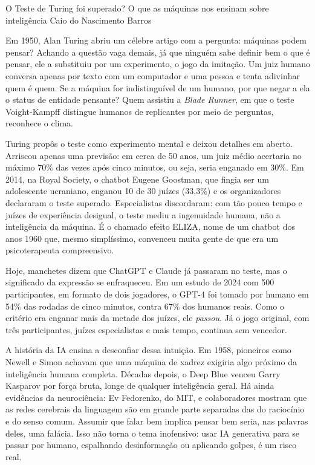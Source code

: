 \hypearticle
{O Teste de Turing foi superado? O que as máquinas nos ensinam sobre inteligência}
{Caio do Nascimento Barros}
{

\subtitle{Uma Pergunta Trocada por um Jogo}

\hspace*{1.5em}Em 1950, Alan Turing abriu um célebre artigo com a pergunta: máquinas podem pensar? Achando a questão vaga demais, já que ninguém sabe definir bem o que é pensar, ele a substituiu por um experimento, o jogo da imitação. Um juiz humano conversa apenas por texto com um computador e uma pessoa e tenta adivinhar quem é quem. Se a máquina for indistinguível de um humano, por que negar a ela o status de entidade pensante? Quem assistiu a \textit{Blade Runner}, em que o teste Voight-Kampff distingue humanos de replicantes por meio de perguntas, reconhece o clima.

\subtitle{Quando o Teste Vira Manchete}

\hspace*{1.5em}Turing propôs o teste como experimento mental e deixou detalhes em aberto. Arriscou apenas uma previsão: em cerca de 50 anos, um juiz médio acertaria no máximo 70\% das vezes após cinco minutos, ou seja, seria enganado em 30\%. Em 2014, na Royal Society, o chatbot Eugene Goostman, que fingia ser um adolescente ucraniano, enganou 10 de 30 juízes (33,3\%) e os organizadores declararam o teste superado. Especialistas discordaram: com tão pouco tempo e juízes de experiência desigual, o teste mediu a ingenuidade humana, não a inteligência da máquina. É o chamado efeito ELIZA, nome de um chatbot dos anos 1960 que, mesmo simplíssimo, convenceu muita gente de que era um psicoterapeuta compreensivo.

\hspace*{1.5em}Hoje, manchetes dizem que ChatGPT e Claude já passaram no teste, mas o significado da expressão se enfraqueceu. Em um estudo de 2024 com 500 participantes, em formato de dois jogadores, o GPT-4 foi tomado por humano em 54\% das rodadas de cinco minutos, contra 67\% dos humanos reais. Como o critério era enganar mais da metade dos juízes, ele \textit{passou}. Já o jogo original, com três participantes, juízes especialistas e mais tempo, continua sem vencedor.

\subtitle{Fluência Não É Inteligência}

\hspace*{1.5em}A história da IA ensina a desconfiar dessa intuição. Em 1958, pioneiros como Newell e Simon achavam que uma máquina de xadrez exigiria algo próximo da inteligência humana completa. Décadas depois, o Deep Blue venceu Garry Kasparov por força bruta, longe de qualquer inteligência geral. Há ainda evidências da neurociência: Ev Fedorenko, do MIT, e colaboradores mostram que as redes cerebrais da linguagem são em grande parte separadas das do raciocínio e do senso comum. Assumir que falar bem implica pensar bem seria, nas palavras deles, uma falácia. Isso não torna o tema inofensivo: usar IA generativa para se passar por humano, espalhando desinformação ou aplicando golpes, é um risco real.

}
